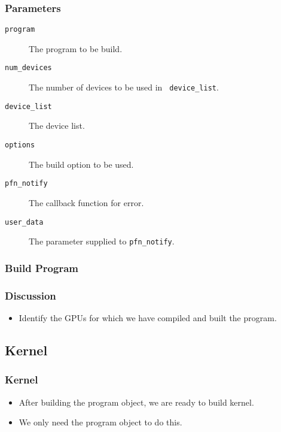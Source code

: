 \documentclass{beamer}
\begin{document}
\begin{frame}
\end{frame}

\begin{frame}
  \frametitle{Parameters}
  \begin{description}
  \item [\tt program] The program to be build.
  \item [\tt num\_devices] The number of devices to be used in {\tt
    device\_list}.
  \item [\tt device\_list] The device list.
  \item [\tt options] The build option to be used.
  \item [\tt pfn\_notify] The callback function for error.
  \item [\tt user\_data] The parameter supplied to {\tt pfn\_notify}.
  \end{description}
\end{frame}


\begin{frame}
  \frametitle{Build Program}
\end{frame}

\begin{frame}
  \frametitle{Discussion}
  \begin{itemize}
  \item Identify the GPUs for which we have compiled and built the
    program.
  \end{itemize}
\end{frame}

\subsection{Kernel}

\begin{frame}
  \frametitle{Kernel}
  \begin{itemize}
  \item After building the program object, we are ready to build
    kernel.
  \item We only need the program object to do this.
  \end{itemize}
\end{frame}

\begin{frame}
\end{frame}
\end{document}
